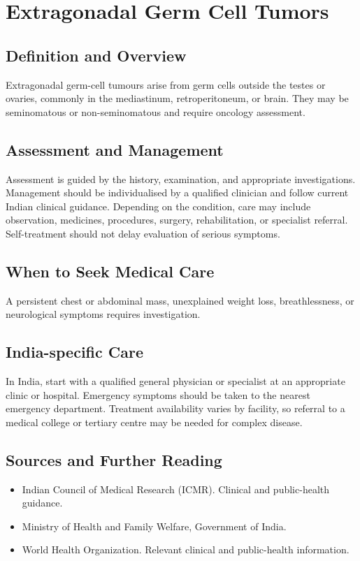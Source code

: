 \chapter{Extragonadal Germ Cell Tumors}

\section*{Definition and Overview}
Extragonadal germ-cell tumours arise from germ cells outside the testes or ovaries, commonly in the mediastinum, retroperitoneum, or brain. They may be seminomatous or non-seminomatous and require oncology assessment.

\section*{Assessment and Management}
Assessment is guided by the history, examination, and appropriate investigations. Management should be individualised by a qualified clinician and follow current Indian clinical guidance. Depending on the condition, care may include observation, medicines, procedures, surgery, rehabilitation, or specialist referral. Self-treatment should not delay evaluation of serious symptoms.

\section*{When to Seek Medical Care}
A persistent chest or abdominal mass, unexplained weight loss, breathlessness, or neurological symptoms requires investigation.

\section*{India-specific Care}
In India, start with a qualified general physician or specialist at an appropriate clinic or hospital. Emergency symptoms should be taken to the nearest emergency department. Treatment availability varies by facility, so referral to a medical college or tertiary centre may be needed for complex disease.

\section*{Sources and Further Reading}
\begin{itemize}
    \item Indian Council of Medical Research (ICMR). Clinical and public-health guidance.
    \item Ministry of Health and Family Welfare, Government of India.
    \item World Health Organization. Relevant clinical and public-health information.
\end{itemize}

